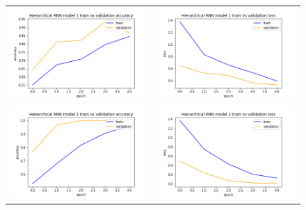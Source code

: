 \begin{figure}
   \centering
\begin{tabular}{cc}
\includegraphics[width=6.5cm]{images/classifier/model-output-hier-rnn-339/model-1-train-vs-validation-accuracy}&
\includegraphics[width=6.5cm]{images/classifier/model-output-hier-rnn-339/model-1-train-vs-validation-loss}\\

\includegraphics[width=6.5cm]{images/classifier/model-output-hier-rnn-339/model-2-train-vs-validation-accuracy}&
\includegraphics[width=6.5cm]{images/classifier/model-output-hier-rnn-339/model-2-train-vs-validation-loss}\\


\end{tabular}
\end{figure}
